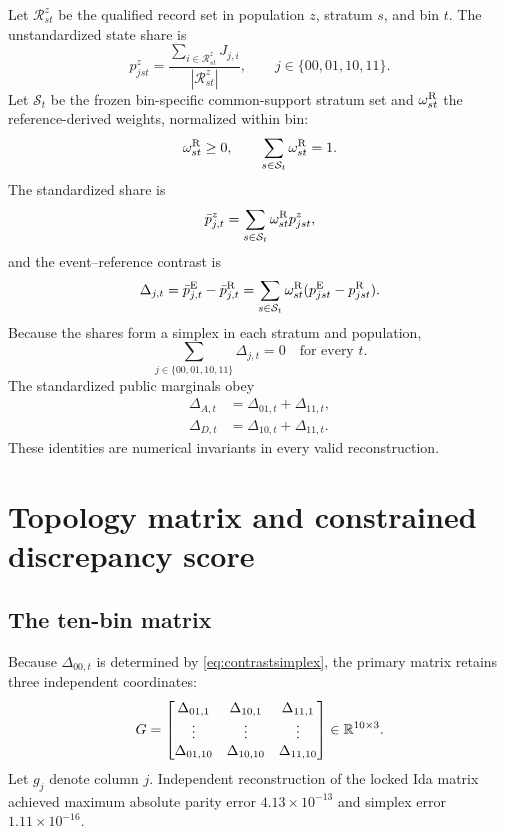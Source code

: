 \documentclass[11pt]{article}
\begin{document}
Let $\mathcal R^z_{st}$ be the qualified record set in population $z$, stratum $s$, and bin $t$. The unstandardized state share is
\begin{equation}
p^z_{jst}
=\frac{\sum_{i\in\mathcal R^z_{st}}J_{j,i}}{|\mathcal R^z_{st}|},
\qquad j\in\{00,01,10,11\}.
\label{eq:rawshare}
\end{equation}
Let $\mathcal S_t$ be the frozen bin-specific common-support stratum set and $\omega^{\mathrm{R}}_{st}$ the reference-derived weights, normalized within bin:
\begin{equation}
\omega^{\mathrm{R}}_{st}\ge0,
\qquad
\sum_{s\in\mathcal S_t}\omega^{\mathrm{R}}_{st}=1.
\end{equation}
The standardized share is
\begin{equation}
\bar p^z_{j,t}=\sum_{s\in\mathcal S_t}\omega^{\mathrm{R}}_{st}p^z_{jst},
\end{equation}
and the event--reference contrast is
\begin{equation}
\Delta_{j,t}=\bar p^{\mathrm{E}}_{j,t}-\bar p^{\mathrm{R}}_{j,t}
=\sum_{s\in\mathcal S_t}\omega^{\mathrm{R}}_{st}(p^{\mathrm{E}}_{jst}-p^{\mathrm{R}}_{jst}).
\label{eq:standardcontrast}
\end{equation}
Because the shares form a simplex in each stratum and population,
\begin{equation}
\sum_{j\in\{00,01,10,11\}}\Delta_{j,t}=0
\quad\text{for every }t.
\label{eq:contrastsimplex}
\end{equation}
The standardized public marginals obey
\begin{align}
\Delta_{A,t}&=\Delta_{01,t}+\Delta_{11,t},\\
\Delta_{D,t}&=\Delta_{10,t}+\Delta_{11,t}.
\label{eq:contrastmarginals}
\end{align}
These identities are numerical invariants in every valid reconstruction.

\section{Topology matrix and constrained discrepancy score}
\label{sec:score}

\subsection{The ten-bin matrix}

Because $\Delta_{00,t}$ is determined by \cref{eq:contrastsimplex}, the primary matrix retains three independent coordinates:
\begin{equation}
G=
\begin{bmatrix}
\Delta_{01,1}&\Delta_{10,1}&\Delta_{11,1}\\
\vdots&\vdots&\vdots\\
\Delta_{01,10}&\Delta_{10,10}&\Delta_{11,10}
\end{bmatrix}
\in\mathbb{R}^{10\times3}.
\label{eq:G}
\end{equation}
Let $g_j$ denote column $j$. Independent reconstruction of the locked Ida matrix achieved maximum absolute parity error $4.13\times10^{-13}$ and simplex error $1.11\times10^{-16}$.
\end{document}
